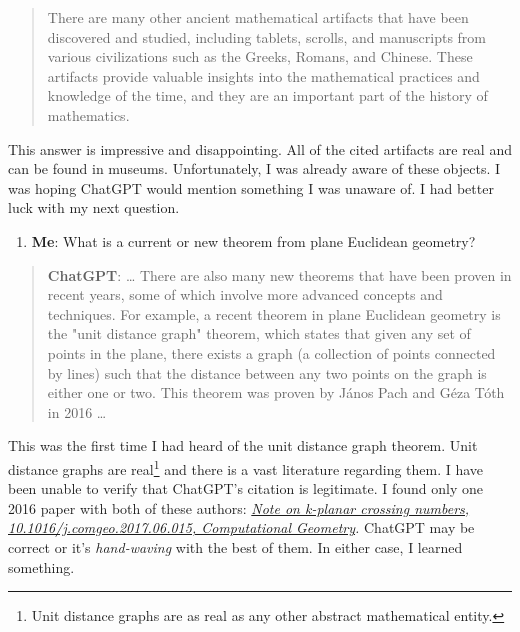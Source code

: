 \begin{quote}
There are many other ancient mathematical artifacts that have been
discovered and studied, including tablets, scrolls, and manuscripts from
various civilizations such as the Greeks, Romans, and Chinese. These
artifacts provide valuable insights into the mathematical practices and
knowledge of the time, and they are an important part of the history of
mathematics.
\end{quote}

This answer is impressive and disappointing. All of the cited artifacts
are real and can be found in museums. Unfortunately, I was already aware
of these objects. I was hoping ChatGPT would mention something I was
unaware of. I had better luck with my next question.

\begin{enumerate}
\def\labelenumi{\arabic{enumi}.}
\setcounter{enumi}{2}
\item
  \textbf{Me}: What is a current or new theorem from plane Euclidean
  geometry?
\end{enumerate}

\begin{quote}
\textbf{ChatGPT}: \ldots{} There are also many new theorems that have
been proven in recent years, some of which involve more advanced
concepts and techniques. For example, a recent theorem in plane
Euclidean geometry is the "unit distance graph" theorem, which states
that given any set of points in the plane, there exists a graph (a
collection of points connected by lines) such that the distance between
any two points on the graph is either one or two. This theorem was
proven by János Pach and Géza Tóth in 2016 \ldots{}
\end{quote}

This was the first time I had heard of the unit distance graph theorem.
Unit distance graphs are
real\footnote{  Unit distance graphs are as real as any other abstract mathematical
  entity.
} and %
there is a vast literature regarding them. I have been unable to
verify that ChatGPT's citation is legitimate. I found only one 2016
paper with both of these authors:
\emph{\href{https://www.researchgate.net/publication/310464347_Note_on_k-planar_crossing_numbers/citation/download}{Note
on k-planar crossing numbers, 10.1016/j.comgeo.2017.06.015,
Computational Geometry}.} ChatGPT may be correct or it's
\emph{hand-waving} with the best of them. In either case, I learned
something.

